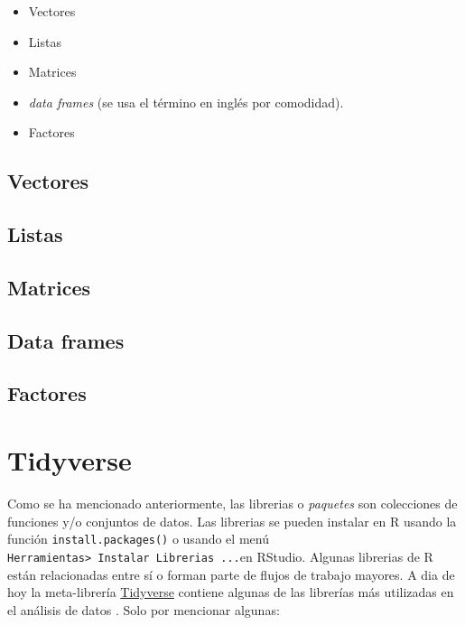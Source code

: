 \documentclass[
]{book}
\providecommand{\tightlist}{%
  \setlength{\itemsep}{0pt}\setlength{\parskip}{0pt}}
\begin{document}
\begin{itemize}
\tightlist
\item
  Vectores
\item
  Listas
\item
  Matrices
\item
  \emph{data frames} (se usa el término en inglés por comodidad).
\item
  Factores
\end{itemize}

\hypertarget{vectores}{%
\subsection{Vectores}\label{vectores}}

\hypertarget{listas}{%
\subsection{Listas}\label{listas}}

\hypertarget{matrices}{%
\subsection{Matrices}\label{matrices}}

\hypertarget{data-frames}{%
\subsection{Data frames}\label{data-frames}}

\hypertarget{factores}{%
\subsection{Factores}\label{factores}}

\hypertarget{tidyverse}{%
\section{Tidyverse}\label{tidyverse}}

Como se ha mencionado anteriormente, las librerias o \emph{paquetes} son colecciones de funciones y/o conjuntos de datos. Las librerias se pueden instalar en R usando la función \texttt{install.packages()} o usando el menú \texttt{Herramientas\textgreater{}\ Instalar\ Librerias\ ...}en RStudio.
Algunas librerias de R están relacionadas entre sí o forman parte de flujos de trabajo mayores. A dia de hoy la meta-librería \href{https://www.tidyverse.org/}{Tidyverse} contiene algunas de las librerías más utilizadas en el análisis de datos \citep{wickham2019tidyverse}. Solo por mencionar algunas:
\end{document}
